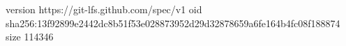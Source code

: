 version https://git-lfs.github.com/spec/v1
oid sha256:13f92899e2442dc8b51f53e028873952d29d32878659a6fe164b4fc08f188874
size 114346
